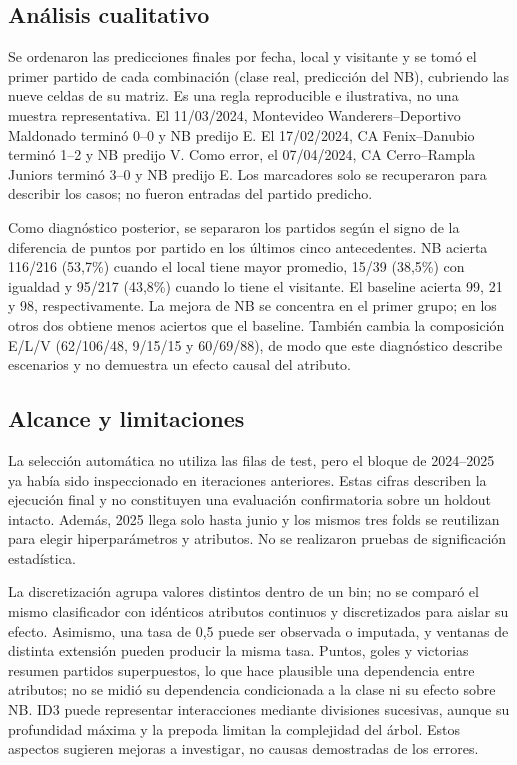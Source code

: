 \documentclass[conference]{IEEEtran}
\begin{document}
\subsection{Análisis cualitativo}
Se ordenaron las predicciones finales por fecha, local y visitante y se tomó el primer partido de cada combinación (clase real, predicción del NB), cubriendo las nueve celdas de su matriz. Es una regla reproducible e ilustrativa, no una muestra representativa. El 11/03/2024, Montevideo Wanderers--Deportivo Maldonado terminó 0--0 y NB predijo E. El 17/02/2024, CA Fenix--Danubio terminó 1--2 y NB predijo V. Como error, el 07/04/2024, CA Cerro--Rampla Juniors terminó 3--0 y NB predijo E. Los marcadores solo se recuperaron para describir los casos; no fueron entradas del partido predicho.

Como diagnóstico posterior, se separaron los partidos según el signo de la diferencia de puntos por partido en los últimos cinco antecedentes. NB acierta 116/216 (53,7\%) cuando el local tiene mayor promedio, 15/39 (38,5\%) con igualdad y 95/217 (43,8\%) cuando lo tiene el visitante. El baseline acierta 99, 21 y 98, respectivamente. La mejora de NB se concentra en el primer grupo; en los otros dos obtiene menos aciertos que el baseline. También cambia la composición E/L/V (62/106/48, 9/15/15 y 60/69/88), de modo que este diagnóstico describe escenarios y no demuestra un efecto causal del atributo.

\subsection{Alcance y limitaciones}
La selección automática no utiliza las filas de test, pero el bloque de 2024--2025 ya había sido inspeccionado en iteraciones anteriores. Estas cifras describen la ejecución final y no constituyen una evaluación confirmatoria sobre un holdout intacto. Además, 2025 llega solo hasta junio y los mismos tres folds se reutilizan para elegir hiperparámetros y atributos. No se realizaron pruebas de significación estadística.

La discretización agrupa valores distintos dentro de un bin; no se comparó el mismo clasificador con idénticos atributos continuos y discretizados para aislar su efecto. Asimismo, una tasa de 0,5 puede ser observada o imputada, y ventanas de distinta extensión pueden producir la misma tasa. Puntos, goles y victorias resumen partidos superpuestos, lo que hace plausible una dependencia entre atributos; no se midió su dependencia condicionada a la clase ni su efecto sobre NB. ID3 puede representar interacciones mediante divisiones sucesivas, aunque su profundidad máxima y la prepoda limitan la complejidad del árbol. Estos aspectos sugieren mejoras a investigar, no causas demostradas de los errores.
\end{document}
